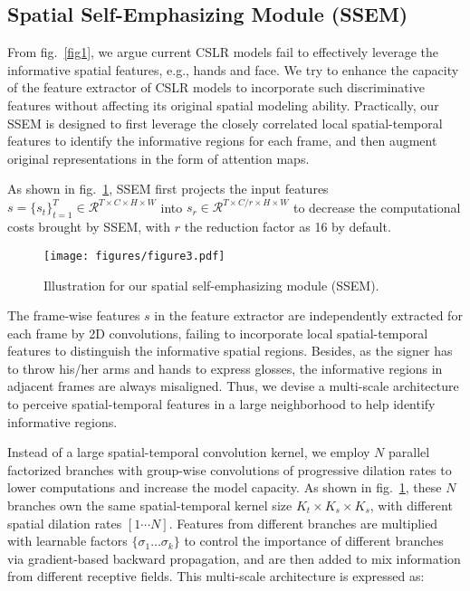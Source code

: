 \documentclass[letterpaper]{article} \usepackage{aaai23}  \usepackage{times}  \usepackage{helvet}  \usepackage{courier}  \usepackage[hyphens]{url}  \usepackage{graphicx} \urlstyle{rm} \def\UrlFont{\rm}  \usepackage{natbib}  \usepackage{caption} \frenchspacing  \setlength{\pdfpagewidth}{8.5in} \setlength{\pdfpageheight}{11in} \usepackage{algorithm}
\begin{document}
\subsection{Spatial Self-Emphasizing Module (SSEM)}
From fig.~\ref{fig1}, we argue current CSLR models fail to effectively leverage the informative spatial features, e.g., hands and face. We try to enhance the capacity of the feature extractor of CSLR models to incorporate such discriminative features without affecting its original spatial modeling ability. Practically, our SSEM is designed to first leverage the closely correlated local spatial-temporal features to identify the informative regions for each frame, and then augment original representations in the form of attention maps.

As shown in fig.~\ref{fig3}, SSEM first projects the input features $s = \{s_t\}_{t=1}^T \in \mathcal{R}^{T \times C\times H \times W}$ into $s_r\in \mathcal{R}^{T \times C/r\times H \times W}$ to decrease the computational costs brought by SSEM, with $r$ the reduction factor as 16 by default.

\begin{figure}[t]
  \centering
  \texttt{[image: figures/figure3.pdf]}
  \caption{Illustration for our spatial self-emphasizing module (SSEM).} \label{fig3}
  \end{figure}

The frame-wise features $s$ in the feature extractor are independently extracted for each frame by 2D convolutions, failing to incorporate local spatial-temporal features to distinguish the informative spatial regions. Besides, as the signer has to throw his/her arms and hands to express glosses, the informative regions in adjacent frames are always misaligned. Thus, we devise a multi-scale architecture to perceive spatial-temporal features in a large neighborhood to help identify informative regions. 

Instead of a large spatial-temporal convolution kernel, we employ $N$ parallel factorized branches with group-wise convolutions of progressive dilation rates to lower computations and increase the model capacity. As shown in fig.~\ref{fig3}, these $N$ branches own the same spatial-temporal kernel size $K_t\times K_s\times K_s$, with different spatial dilation rates $[1\cdots N]$. Features from different branches are multiplied with learnable factors $\{\sigma_{1}\dots \sigma_k\}$ to control the importance of different branches via gradient-based backward propagation, and are then added to mix information from different receptive fields. This multi-scale architecture is expressed as:
\end{document}
